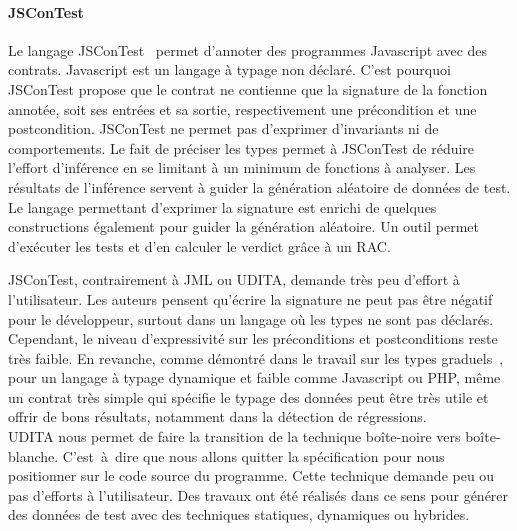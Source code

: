 \paragraph{JSConTest} Le langage JSConTest~ permet d'annoter
des programmes Javascript avec des contrats. Javascript est un langage à typage
non déclaré. C'est pourquoi JSConTest propose que le contrat ne contienne que
la signature de la fonction annotée, soit ses entrées et sa sortie,
respectivement une précondition et une postcondition. JSConTest ne permet pas
d'exprimer d'invariants ni de comportements. Le fait de préciser les types
permet à JSConTest de réduire l'effort d'inférence en se limitant à un minimum
de fonctions à analyser. Les résultats de l'inférence servent à guider la
génération aléatoire de données de test. Le langage permettant d'exprimer la
signature est enrichi de quelques constructions également pour guider la
génération aléatoire. Un outil permet d'exécuter les tests et d'en calculer le
verdict grâce à un RAC.

JSConTest, contrairement à JML ou UDITA, demande très peu d'effort à
l'utilisateur. Les auteurs pensent qu'écrire la signature ne peut pas être
négatif pour le développeur, surtout dans un langage où les types ne sont pas
déclarés. Cependant, le niveau d'expressivité sur les préconditions et
postconditions reste très faible. En revanche, comme démontré dans le travail
sur les types graduels~, pour un langage à typage dynamique et
faible comme Javascript ou PHP, même un contrat très simple qui spécifie le
typage des données peut être très utile et offrir de bons résultats, notamment
dans la détection de régressions. \\

UDITA nous permet de faire la transition de la technique boîte-noire vers
boîte-blanche. C'est~à~dire que nous allons quitter la spécification pour nous
positionner sur le code source du programme. Cette technique demande peu ou pas
d'efforts à l'utilisateur. Des travaux ont été réalisés dans ce sens pour
générer des données de test avec des techniques statiques, dynamiques ou
hybrides.

